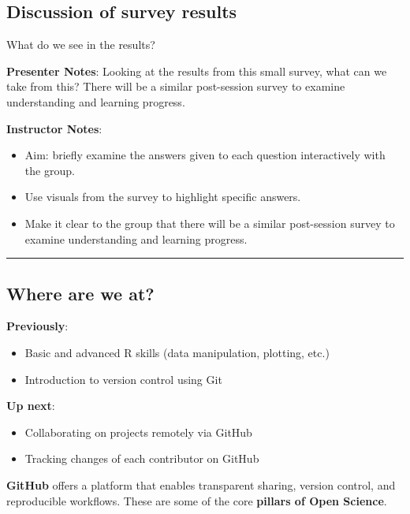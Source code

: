 \documentclass[
  letterpaper,
  DIV=11,
  numbers=noendperiod]{scrartcl}
\providecommand{\tightlist}{%
  \setlength{\itemsep}{0pt}\setlength{\parskip}{0pt}}
\begin{document}
\subsection{Discussion of survey
results}\label{discussion-of-survey-results}

What do we see in the results?

\textbf{Presenter Notes}: Looking at the results from this small survey,
what can we take from this? There will be a similar post-session survey
to examine understanding and learning progress.

\textbf{Instructor Notes}:

\begin{itemize}
\item
  Aim: briefly examine the answers given to each question interactively
  with the group.
\item
  Use visuals from the survey to highlight specific answers.
\item
  Make it clear to the group that there will be a similar post-session
  survey to examine understanding and learning progress.
\end{itemize}

\begin{center}\rule{0.5\linewidth}{0.5pt}\end{center}

\subsection{Where are we at?}\label{where-are-we-at}

\textbf{Previously}:

\begin{itemize}
\tightlist
\item
  Basic and advanced R skills (data manipulation, plotting, etc.)
\item
  Introduction to version control using Git
\end{itemize}

\textbf{Up next}:

\begin{itemize}
\tightlist
\item
  Collaborating on projects remotely via GitHub
\item
  Tracking changes of each contributor on GitHub
\end{itemize}

\begin{tcolorbox}[enhanced jigsaw, arc=.35mm, bottomrule=.15mm, bottomtitle=1mm, breakable, colback=white, colbacktitle=quarto-callout-note-color!10!white, colframe=quarto-callout-note-color-frame, coltitle=black, left=2mm, leftrule=.75mm, opacityback=0, opacitybacktitle=0.6, rightrule=.15mm, title=\textcolor{quarto-callout-note-color}{\faInfo}\hspace{0.5em}{GitHub and Open Science}, titlerule=0mm, toprule=.15mm, toptitle=1mm]

\textbf{GitHub} offers a platform that enables transparent sharing,
version control, and reproducible workflows. These are some of the core
\textbf{pillars of Open Science}.

\end{tcolorbox}
\end{document}

